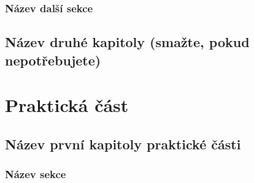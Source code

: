 \documentclass[12pt]{report}
\begin{document}

\section{Název další sekce}


\chapter{Název druhé kapitoly (smažte, pokud nepotřebujete)}


\part{Praktická část}

\chapter{Název první kapitoly praktické části}

\section{Název sekce}





\end{document}
